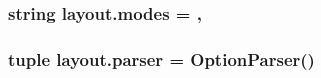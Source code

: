 \subsubsection[{modes}]{\setlength{\rightskip}{0pt plus 5cm}string layout.\+modes = \textquotesingle{},\textquotesingle{}}\label{namespacelayout_a47fd03efd473398dfb10a65fc64eafe4}
\hypertarget{namespacelayout_a465a2855518606877a0a8671d58a1c9a}{}
\subsubsection[{parser}]{\setlength{\rightskip}{0pt plus 5cm}tuple layout.\+parser = Option\+Parser()}\label{namespacelayout_a465a2855518606877a0a8671d58a1c9a}
